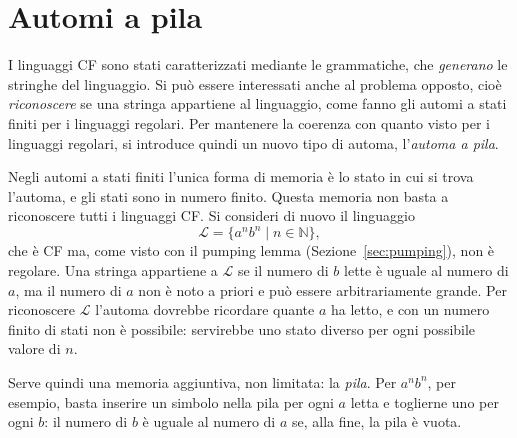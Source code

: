 \documentclass[a4paper, 11pt, oneside]{book}
\theoremstyle{formale}
\begin{document}
    \section{Automi a pila}
    \label{sec:automi-pila}
    I linguaggi CF sono stati caratterizzati mediante le grammatiche, che
    \emph{generano} le stringhe del linguaggio. Si pu\`o essere interessati anche al
    problema opposto, cio\`e \emph{riconoscere} se una stringa appartiene al linguaggio,
    come fanno gli automi a stati finiti per i linguaggi regolari. Per mantenere la
    coerenza con quanto visto per i linguaggi regolari, si introduce quindi un nuovo tipo
    di automa, l'\emph{automa a pila}.

    Negli automi a stati finiti l'unica forma di memoria \`e lo stato in cui si trova
    l'automa, e gli stati sono in numero finito. Questa memoria non basta a riconoscere
    tutti i linguaggi CF. Si consideri di nuovo il linguaggio
    \begin{equation*}
        \mathcal{L} = \{a^n b^n \mid n \in \mathbb{N}\},
    \end{equation*}
    che \`e CF ma, come visto con il pumping lemma (Sezione~\ref{sec:pumping}), non \`e
    regolare. Una stringa appartiene a $\mathcal{L}$ se il numero di $b$ lette \`e uguale
    al numero di $a$, ma il numero di $a$ non \`e noto a priori e pu\`o essere
    arbitrariamente grande. Per riconoscere $\mathcal{L}$ l'automa dovrebbe ricordare
    quante $a$ ha letto, e con un numero finito di stati non \`e possibile: servirebbe uno
    stato diverso per ogni possibile valore di $n$.

    Serve quindi una memoria aggiuntiva, non limitata: la \emph{pila}. Per $a^n b^n$, per
    esempio, basta inserire un simbolo nella pila per ogni $a$ letta e toglierne uno per
    ogni $b$: il numero di $b$ \`e uguale al numero di $a$ se, alla fine, la pila \`e
    vuota.
\end{document}
